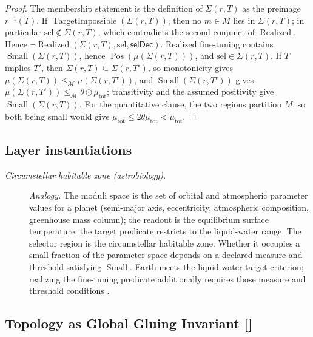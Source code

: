\begin{proof}
The membership statement is the definition of
\(\Sigma(r,T)\) as the preimage \(r^{-1}(T)\).  If
\(\operatorname{TargetImpossible}(\Sigma(r,T))\), then no \(m\in M\) lies in
\(\Sigma(r,T)\); in particular \(\mathrm{sel}\notin\Sigma(r,T)\), which
contradicts the second conjunct of \(\operatorname{Realized}\).  Hence
\(\neg\operatorname{Realized}(\Sigma(r,T),\mathrm{sel},\mathsf{selDec})\).
Realized fine-tuning contains \(\operatorname{Small}(\Sigma(r,T))\), hence
\(\operatorname{Pos}(\mu(\Sigma(r,T)))\), and \(\mathrm{sel}\in\Sigma(r,T)\).
If \(T\) implies \(T'\), then \(\Sigma(r,T)\subseteq\Sigma(r,T')\), so
monotonicity gives \(\mu(\Sigma(r,T))\le_{\mathcal M}\mu(\Sigma(r,T'))\), and
\(\operatorname{Small}(\Sigma(r,T'))\) gives
\(\mu(\Sigma(r,T'))\le_{\mathcal M}\theta\odot\mu_{\mathrm{tot}}\);
transitivity and the assumed positivity give
\(\operatorname{Small}(\Sigma(r,T))\).
For the quantitative clause, the two regions partition \(M\), so both being
small would give \(\mu_{\mathrm{tot}}\le2\theta\mu_{\mathrm{tot}}<\mu_{\mathrm{tot}}\).
\end{proof}

\subsection*{Layer instantiations}\label{layer-inst:F47}

\begingroup\small
\begin{description}
\item[\emph{Circumstellar habitable zone (astrobiology).}] \textit{Analogy.}
The moduli space is the set of orbital and
atmospheric parameter values for a planet (semi-major
axis, eccentricity, atmospheric composition, greenhouse
mass column); the readout is the equilibrium surface
temperature; the target predicate restricts to the
liquid-water range.  The selector region is the circumstellar habitable zone.
Whether it occupies a small fraction of the parameter space
depends on a declared measure and threshold satisfying
\(\operatorname{Small}\). Earth meets the liquid-water target
criterion; realizing the fine-tuning predicate additionally
requires those measure and threshold conditions
\citep{Kasting1993Habitable}.

\end{description}
\endgroup


\subsection{Topology as Global Gluing Invariant [\texorpdfstring{}{F48}]}\label{sec:self-reference-limits:topology}

